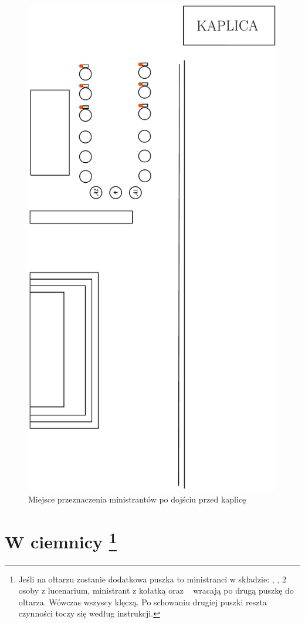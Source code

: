 \begin{figure}[h]
      \centering
      \includegraphics[width=0.5\linewidth,angle=270]{Figures/Czwartek/Procesja4.pdf}
      \caption{Miejsce przeznaczenia ministrantów po dojściu przed kaplicę}
      \label{fig:procesja4_czw}
\end{figure}

\section[W ciemnicy]{W ciemnicy \protect\footnote{Jeśli na ołtarzu zostanie
        dodatkowa puszka to ministranci w składzie: \ii,  , 2 osoby z
        lucenarium, ministrant z kołatką oraz \oo~ wracają po drugą puszkę do
        ołtarza. Wówczas wszyscy klęczą. Po schowaniu drugiej puszki reszta
        czynności toczy się według instrukcji.}}

